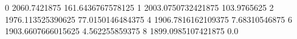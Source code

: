 0 2060.7421875 161.6436767578125
1 2003.0750732421875 103.9765625
2 1976.113525390625 77.0150146484375
4 1906.7816162109375 7.68310546875
6 1903.6607666015625 4.562255859375
8 1899.0985107421875 0.0
